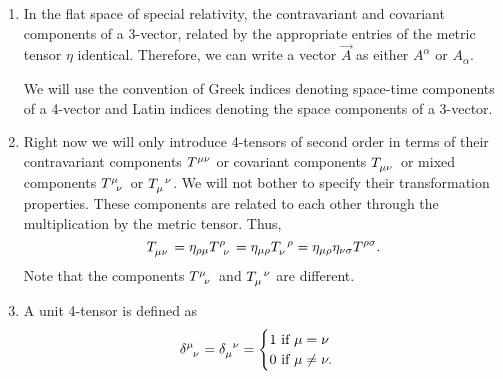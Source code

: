 \begin{enumerate}
\item In the flat space of special relativity, the contravariant and
covariant components of a 3-vector, related by the appropriate entries of the
metric tensor $\eta$ identical. Therefore, we can write a vector $\vec{A}$ as
either $A^\alpha$ or $A_\alpha$.

We will use the convention of Greek indices denoting space-time components of 
a 4-vector and Latin indices denoting the space components of a 3-vector.

\item Right now we will only introduce 4-tensors of second order in terms of 
their contravariant components $\tensor{T}{^{\mu\nu}}$ or covariant components 
$\tensor{T}{_{\mu\nu}}$ or mixed components $\tensor{T}{^\mu_\nu}$ or $\tensor{T}{_\mu^\nu}
$. We will not bother to specify their transformation properties. These 
components are related to each other through the multiplication by the metric
tensor. Thus, 
\begin{equation}\label{c1e50}
\tensor{T}{_{\mu\nu}} = \eta_{\rho\mu}\tensor{T}{^\rho_\nu} =
\eta_{\mu\rho}\tensor{T}{_\nu^\rho} = 
\eta_{\mu\rho}\eta_{\nu\sigma}T^{\rho\sigma}.
\end{equation}
Note that the components $\tensor{T}{^\mu_\nu}$ and $\tensor{T}{_\mu^\nu}$ are 
different.

\item A unit 4-tensor is defined as
\begin{equation}\label{c1e51}
\tensor{\delta}{^\mu_\nu} = \tensor{\delta}{_\mu^\nu} = \begin{cases}
1 \text{  if  } \mu = \nu \\
0 \text{  if  } \mu \ne \nu.
\end{cases}
\end{equation}


\end{enumerate}
